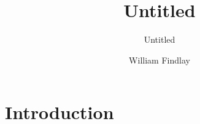 \documentclass[
    12pt,
    twocolumn,
]
{findlayart}
\title{Untitled}
\subtitle{Untitled}
\author{William Findlay}
\begin{document}

\maketitle
\thispagestyle{empty}
%
%



\onehalfspacing

\newpage
{}
\setcounter{page}{1}

\begin{abstract}
\end{abstract}

\section{Introduction}









\clearpage

\printbibliography











\end{document}
